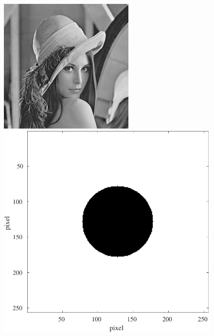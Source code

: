 \begin{figure}[H]
    \centering
    \begin{minipage}[b]{.15\textwidth}
        \centering
        \includegraphics[keepaspectratio,width=\textwidth]{../../LENNA.jpeg}
    \end{minipage}
    \begin{minipage}[b]{.15\textwidth}
        \centering
        \includegraphics[keepaspectratio,width=\textwidth]{../../Figures/08_41_filter.pdf}

\end{minipage}
\end{figure}
